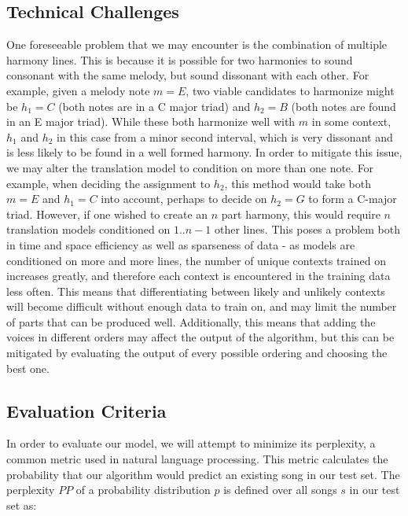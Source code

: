 \documentclass{sig-alternate}
\begin{document}
\subsection{Technical Challenges}
\label{subsec:tech_challenges}
One foreseeable problem that we may encounter is the combination of multiple harmony lines. This is because it is possible
for two harmonies to sound consonant with the same melody, but sound dissonant with each other. For example, given a melody note
$m = E$, two viable candidates to harmonize might be $h_1 = C$ (both notes are in a C major triad) and $h_2 = B$ (both notes are found in an E major triad). While these both harmonize well with $m$ in some context, $h_1$ and $h_2$ in this case from a minor second interval, which is very dissonant and is less likely to be found in a well formed harmony. In order to mitigate this issue, we may alter the translation model to condition on more than one note. For example, when deciding the assignment to $h_2$, this method would take both $m = E$ and $h_1 = C$ into account, perhaps to decide on $h_2 = G$ to form a C-major triad. However, if one wished to create an $n$ part harmony, this would require $n$ translation models conditioned on $1 .. n-1$ other lines. This poses a problem both in time and space efficiency as well as sparseness of data - as models are conditioned on more and more lines, the number of unique contexts trained on increases greatly, and therefore each context is encountered in the training data less often.
This means that differentiating between likely and unlikely contexts will become difficult without enough data to train on, and may
limit the number of parts that can be produced well. Additionally, this means that adding the voices in different orders may affect
the output of the algorithm, but this can be mitigated by evaluating the output of every possible ordering and choosing the best one.

\subsection{Evaluation Criteria}
\label{subsec:eval_criteria}
In order to evaluate our model, we will attempt to minimize its perplexity, a common metric used in natural language 
processing. This metric calculates the probability that our algorithm would predict an existing song in our test set. The perplexity $PP$ \cite{Koehn:2010:SMT:1734086} of a probability distribution $p$ is defined over all songs $s$ in our test set as:\\
\end{document}

